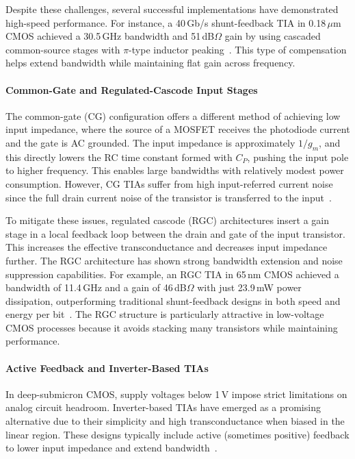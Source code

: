 \documentclass[11pt]{article}
\begin{document}
Despite these challenges, several successful implementations have demonstrated high-speed performance. For instance, a 40\,Gb/s shunt-feedback TIA in 0.18\,$\mu$m CMOS achieved a 30.5\,GHz bandwidth and 51\,dB$\Omega$ gain by using cascaded common-source stages with $\pi$-type inductor peaking~\cite{tia40gbps}. This type of compensation helps extend bandwidth while maintaining flat gain across frequency.

\paragraph{Common-Gate and Regulated-Cascode Input Stages}

The common-gate (CG) configuration offers a different method of achieving low input impedance, where the source of a MOSFET receives the photodiode current and the gate is AC grounded. The input impedance is approximately $1/g_m$, and this directly lowers the RC time constant formed with $C_P$, pushing the input pole to higher frequency. This enables large bandwidths with relatively modest power consumption. However, CG TIAs suffer from high input-referred current noise since the full drain current noise of the transistor is transferred to the input~\cite{cmos_tia_ijvlsi}.

To mitigate these issues, regulated cascode (RGC) architectures insert a gain stage in a local feedback loop between the drain and gate of the input transistor. This increases the effective transconductance and decreases input impedance further. The RGC architecture has shown strong bandwidth extension and noise suppression capabilities. For example, an RGC TIA in 65\,nm CMOS achieved a bandwidth of 11.4\,GHz and a gain of 46\,dB$\Omega$ with just 23.9\,mW power dissipation, outperforming traditional shunt-feedback designs in both speed and energy per bit~\cite{rgc_mdpi}. The RGC structure is particularly attractive in low-voltage CMOS processes because it avoids stacking many transistors while maintaining performance.

\paragraph{Active Feedback and Inverter-Based TIAs}

In deep-submicron CMOS, supply voltages below 1\,V impose strict limitations on analog circuit headroom. Inverter-based TIAs have emerged as a promising alternative due to their simplicity and high transconductance when biased in the linear region. These designs typically include active (sometimes positive) feedback to lower input impedance and extend bandwidth~\cite{inverter_mdpi}.
\end{document}
